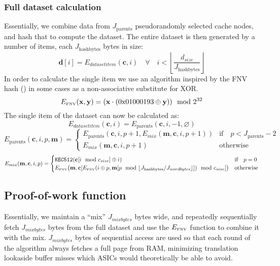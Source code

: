\documentclass[9pt,oneside]{amsart}
\begin{document}
\subsubsection{Full dataset calculation} \label{dataset}
Essentially, we combine data from $J_{\mathrm{parents}}$ pseudorandomly selected cache nodes, and hash that to compute the dataset. The entire dataset is then generated by a number of items, each $J_{\mathrm{hashbytes}}$ bytes in size:
\begin{equation}
 \mathbf{d}[i] = E_{datasetitem}(\mathbf{c}, i) \quad \forall \quad i < \left\lfloor\frac{d_{size}}{J_{\mathrm{hashbytes}}}\right\rfloor
\end{equation}
In order to calculate the single item we use an algorithm inspired by the FNV hash (\cite{FowlerNollVo1991FNVHash}) in some cases as a non-associative substitute for XOR.
\begin{equation}
 E_\text{\tiny FNV}(\mathbf{x}, \mathbf{y}) = (\mathbf{x} \cdot (\mathrm{0x01000193} \oplus \mathbf{y})) \mod 2^{32}
\end{equation}
The single item of the dataset can now be calculated as:
\begin{equation}
 E_{datasetitem}(\mathbf{c}, i) = E_{\mathrm{parents}}(\mathbf{c}, i, -1, \varnothing)
\end{equation}
\begin{equation}
  E_{\mathrm{parents}}(\mathbf{c}, i, p, \mathbf{m}) = \begin{cases}
E_{\mathrm{parents}}(\mathbf{c}, i, p +1, E_{mix}(\mathbf{m}, \mathbf{c}, i, p + 1)) & \text{if} \quad p < J_{\mathrm{parents}} -2 \\
E_{mix}(\mathbf{m}, \mathbf{c}, i, p + 1) & \text{otherwise}
\end{cases}
\end{equation}
\begin{equation}
 E_{mix}(\mathbf{m}, \mathbf{c}, i, p) = \begin{cases}
\texttt{KEC512}(\mathbf{c}[i \mod c_{size}] \oplus i) & \text{if} \quad p = 0 \\
E_\text{\tiny FNV}\big(\mathbf{m}, \mathbf{c}[E_\text{\tiny FNV}(i \oplus p, \mathbf{m}[p \mod \lfloor J_{\mathrm{hashbytes}} / J_{wordbytes} \rfloor]) \mod c_{size}] \big) & \text{otherwise}
\end{cases}
\end{equation}

\subsection{Proof-of-work function}
Essentially, we maintain a ``mix'' $J_{mixbytes}$ bytes wide, and repeatedly sequentially fetch $J_{mixbytes}$ bytes from the full dataset and use the $E_\text{\tiny FNV}$ function to combine it with the mix. $J_{mixbytes}$ bytes of sequential access are used so that each round of the algorithm always fetches a full page from RAM, minimizing translation lookaside buffer misses which ASICs would theoretically be able to avoid.
\end{document}

